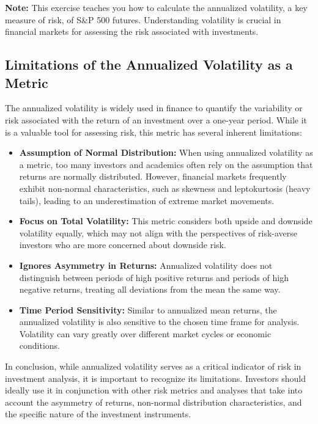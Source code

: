 \documentclass{article}
\begin{document}
\textbf{Note:} This exercise teaches you how to calculate the annualized volatility, a key measure of risk, of S\&P 500 futures. Understanding volatility is crucial in financial markets for assessing the risk associated with investments.

\subsection{Limitations of the Annualized Volatility as a Metric}

The annualized volatility is widely used in finance to quantify the variability or risk associated with the return of an investment over a one-year period. While it is a valuable tool for assessing risk, this metric has several inherent limitations:

\begin{itemize}
    \item \textbf{Assumption of Normal Distribution:} When using annualized volatility as a metric, too many investors and academics often rely on the assumption that returns are normally distributed. However, financial markets frequently exhibit non-normal characteristics, such as skewness and leptokurtosis (heavy tails), leading to an underestimation of extreme market movements.
    \item \textbf{Focus on Total Volatility:} This metric considers both upside and downside volatility equally, which may not align with the perspectives of risk-averse investors who are more concerned about downside risk.
    \item \textbf{Ignores Asymmetry in Returns:} Annualized volatility does not distinguish between periods of high positive returns and periods of high negative returns, treating all deviations from the mean the same way.
    \item \textbf{Time Period Sensitivity:} Similar to annualized mean returns, the annualized volatility is also sensitive to the chosen time frame for analysis. Volatility can vary greatly over different market cycles or economic conditions.
\end{itemize}

In conclusion, while annualized volatility serves as a critical indicator of risk in investment analysis, it is important to recognize its limitations. Investors should ideally use it in conjunction with other risk metrics and analyses that take into account the asymmetry of returns, non-normal distribution characteristics, and the specific nature of the investment instruments.
\end{document}
